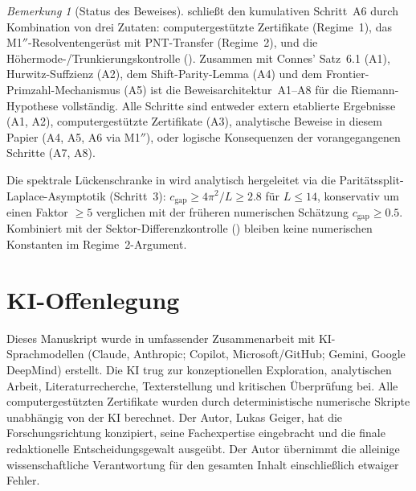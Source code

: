 \documentclass[12pt,a4paper]{article}
\theoremstyle{definition}
\theoremstyle{remark}
\newtheorem{remark}[theorem]{Bemerkung}
\begin{document}
\begin{remark}[Status des Beweises]
\label{rem:M1-status}
 schließt den kumulativen Schritt~A6 durch Kombination von drei Zutaten: computergestützte Zertifikate (Regime~1), das M1$''$-Resolventengerüst mit PNT-Transfer (Regime~2), und die Höhermode-/Trunkierungskontrolle (). Zusammen mit Connes' Satz~6.1 (A1), Hurwitz-Suffzienz (A2), dem Shift-Parity-Lemma (A4) und dem Frontier-Primzahl-Mechanismus (A5) ist die Beweisarchitektur~A1--A8 für die Riemann-Hypothese vollständig. Alle Schritte sind entweder extern etablierte Ergebnisse (A1, A2), computergestützte Zertifikate (A3), analytische Beweise in diesem Papier (A4, A5, A6 via M1$''$), oder logische Konsequenzen der vorangegangenen Schritte (A7, A8).

Die spektrale Lückenschranke in  wird analytisch hergeleitet via die Paritätssplit-Laplace-Asymptotik (Schritt~3): $c_{\mathrm{gap}} \geq 4\pi^2/L \geq 2.8$ für $L \leq 14$, konservativ um einen Faktor $\geq 5$ verglichen mit der früheren numerischen Schätzung $c_{\mathrm{gap}} \geq 0.5$. Kombiniert mit der Sektor-Differenzkontrolle () bleiben keine numerischen Konstanten im Regime~2-Argument.
\end{remark}


\section*{KI-Offenlegung}

Dieses Manuskript wurde in umfassender Zusammenarbeit mit KI-Sprachmodellen (Claude, Anthropic; Copilot, Microsoft/GitHub; Gemini, Google DeepMind) erstellt. Die KI trug zur konzeptionellen Exploration, analytischen Arbeit, Literaturrecherche, Texterstellung und kritischen \"Uberpr\"ufung bei. Alle computergest\"utzten Zertifikate wurden durch deterministische numerische Skripte unabh\"angig von der KI berechnet. Der Autor, Lukas Geiger, hat die Forschungsrichtung konzipiert, seine Fachexpertise eingebracht und die finale redaktionelle Entscheidungsgewalt ausge\"ubt. Der Autor \"ubernimmt die alleinige wissenschaftliche Verantwortung f\"ur den gesamten Inhalt einschlie\ss lich etwaiger Fehler.




\end{document}

